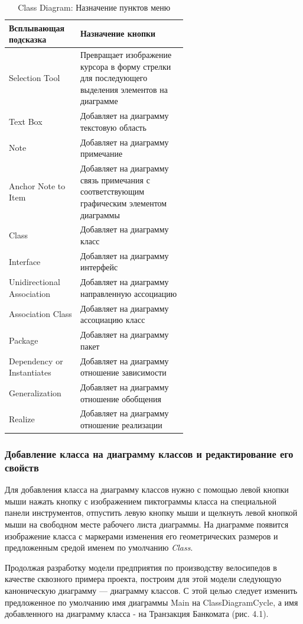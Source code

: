 \documentclass[a4paper,12pt]{report}
\begin{document}
\begin{table}[htbp]
	
	\begin{center}
		\begin{tabular}{|l|m{0.6\linewidth}|}
			\hline
			\textbf{Всплывающая подсказка} & \textbf{Назначение кнопки} \\ \hline
			Selection Tool & Превращает изображение курсора в форму стрелки для последующего выделения элементов на диаграмме \\ \hline
			Text Box & Добавляет на диаграмму текстовую область \\ \hline
			Note & Добавляет на диаграмму примечание \\ \hline
			Anchor Note to Item & Добавляет на диаграмму связь примечания с соответствующим графическим элементом диаграммы \\ \hline
			Class & Добавляет на диаграмму класс \\ \hline
			Interface & Добавляет на диаграмму интерфейс \\ \hline
			Unidirectional Association & Добавляет на диаграмму направленную ассоциацию \\ \hline
			Association Class & Добавляет на диаграмму ассоциацию класс \\ \hline
			Package & Добавляет на диаграмму пакет \\ \hline
			Dependency or Instantiates & Добавляет на диаграмму отношение зависимости \\ \hline
			Generalization & Добавляет на диаграмму отношение обобщения \\ \hline
			Realize & Добавляет на диаграмму отношение реализации \\ \hline
		\end{tabular}
	\end{center}
	\caption{Class Diagram: Назначение пунктов меню}
	\label{tab:toolboxclass}
\end{table}
\subsubsection*{Добавление класса на диаграмму классов и редактирование его свойств}
Для добавления класса на диаграмму классов нужно с помощью левой кнопки мыши нажать кнопку с изображением пиктограммы класса на специальной панели инструментов, отпустить левую кнопку мыши и щелкнуть левой кнопкой мыши на свободном месте рабочего листа диаграммы. На диаграмме появится изображение класса с маркерами изменения его геометрических размеров и предложенным средой именем по умолчанию \textit{Class}.

Продолжая разработку модели предприятия по производству велосипедов в качестве сквозного примера проекта, построим для этой модели следующую каноническую диаграмму --- диаграмму классов. С этой целью следует изменить предложенное по умолчанию имя диаграммы Main на ClassDiagramCycle, а имя добавленного на диаграмму класса - на Транзакция Банкомата (рис. 4.1).
\end{document}
